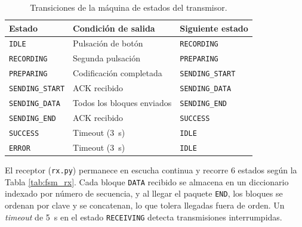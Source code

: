\begin{table}[htb]
    \centering
    \caption{Transiciones de la máquina de estados del transmisor.}
    \label{tab:fsm_tx}
    \begin{tabular}{@{}lll@{}}
        \toprule
        Estado & Condición de salida & Siguiente estado \\
        \midrule
        \texttt{IDLE}           & Pulsación de botón         & \texttt{RECORDING}     \\
        \texttt{RECORDING}      & Segunda pulsación          & \texttt{PREPARING}     \\
        \texttt{PREPARING}      & Codificación completada    & \texttt{SENDING\_START} \\
        \texttt{SENDING\_START} & ACK recibido               & \texttt{SENDING\_DATA} \\
        \texttt{SENDING\_DATA}  & Todos los bloques enviados & \texttt{SENDING\_END}  \\
        \texttt{SENDING\_END}   & ACK recibido               & \texttt{SUCCESS}       \\
        \texttt{SUCCESS}        & Timeout (\SI{3}{\second})  & \texttt{IDLE}          \\
        \texttt{ERROR}          & Timeout (\SI{3}{\second})  & \texttt{IDLE}          \\
        \bottomrule
    \end{tabular}
\end{table}

El receptor (\texttt{rx.py}) permanece en escucha continua y recorre $6$ estados según la Tabla \ref{tab:fsm_rx}.
Cada bloque \texttt{DATA} recibido se almacena en un diccionario indexado por número de secuencia, y al llegar el paquete \texttt{END}, los bloques se ordenan por clave y se concatenan, lo que tolera llegadas fuera de orden.
Un \textit{timeout} de \SI{5}{\second} en el estado \texttt{RECEIVING} detecta transmisiones interrumpidas.

